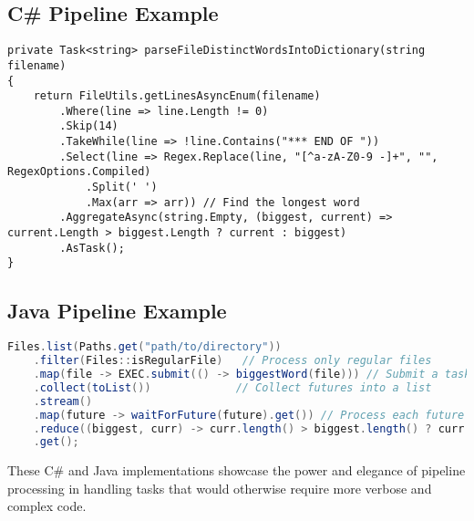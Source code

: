 \clearpage

\lstset{basicstyle=\footnotesize\ttfamily} %

\subsection{C\# Pipeline Example}

\begin{lstlisting}[language={[Sharp]C}, caption={C\# Pipeline for Parsing Distinct Words into a Dictionary}]
private Task<string> parseFileDistinctWordsIntoDictionary(string filename)
{
    return FileUtils.getLinesAsyncEnum(filename)
        .Where(line => line.Length != 0)   
        .Skip(14)                          
        .TakeWhile(line => !line.Contains("*** END OF ")) 
        .Select(line => Regex.Replace(line, "[^a-zA-Z0-9 -]+", "", RegexOptions.Compiled)
            .Split(' ')
            .Max(arr => arr)) // Find the longest word
        .AggregateAsync(string.Empty, (biggest, current) => current.Length > biggest.Length ? current : biggest) 
        .AsTask();
}
\end{lstlisting}

\subsection{Java Pipeline Example}
\begin{lstlisting}[language=Java, caption={Java Pipeline for Finding the Largest Word in Files}]
Files.list(Paths.get("path/to/directory"))
    .filter(Files::isRegularFile)   // Process only regular files
    .map(file -> EXEC.submit(() -> biggestWord(file))) // Submit a task for each file
    .collect(toList())             // Collect futures into a list
    .stream()
    .map(future -> waitForFuture(future).get()) // Process each future
    .reduce((biggest, curr) -> curr.length() > biggest.length() ? curr : biggest) // Reduce to find the largest word
    .get();
\end{lstlisting}

\lstset{basicstyle=\normalsize\ttfamily} %

These C\# and Java implementations showcase the power and elegance of pipeline processing in handling tasks that would otherwise require more verbose and complex code.
